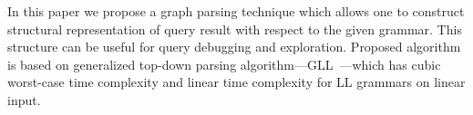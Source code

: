 \documentclass{sig-alternate} %
\begin{document}
In this paper we propose a graph parsing technique which allows one to construct structural representation of query result with respect to the given grammar.
This structure can be useful for query debugging and exploration. 
Proposed algorithm is based on generalized top-down parsing algorithm---GLL~\cite{scott2010gll}---which has cubic worst-case time complexity and linear time complexity for LL grammars on linear input.  














\balancecolumns
\end{document}
